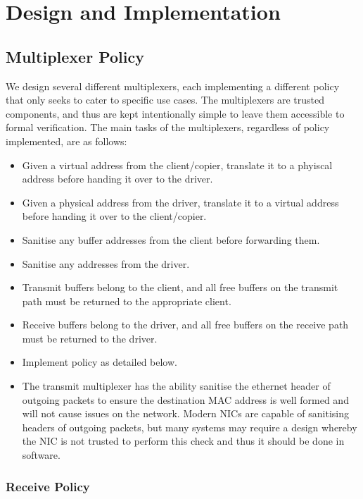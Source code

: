 \chapter{Design and Implementation}\label{ch:design}

\section{Multiplexer Policy}

We design several different multiplexers, each implementing a different policy
that only seeks to cater to specific use cases. The multiplexers are trusted components,
and thus are kept intentionally simple to leave them accessible to formal verification.
The main tasks of the multiplexers, regardless of policy implemented, are as follows:

\begin{itemize}
    \item Given a virtual address from the client/copier, translate it to a phyiscal address before
            handing it over to the driver.
    \item Given a physical address from the driver, translate it to a virtual address before
            handing it over to the client/copier.
    \item Sanitise any buffer addresses from the client before forwarding them.
    \item Sanitise any addresses from the driver. 
    \item Transmit buffers belong to the client, and all free buffers on the transmit path
            must be returned to the appropriate client.
    \item Receive buffers belong to the driver, and all free buffers on the receive path
            must be returned to the driver.
    \item Implement policy as detailed below.
    \item The transmit multiplexer has the ability sanitise the ethernet header of outgoing packets
          to ensure the destination MAC address is well formed and will not cause issues
          on the network. Modern NICs are capable of sanitising headers of outgoing packets,
          but many systems may require a design whereby the NIC is not trusted to perform this check 
          and thus it should be done in software.
\end{itemize}

\subsection{Receive Policy}


